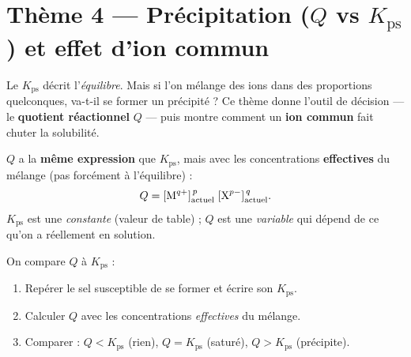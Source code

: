 \documentclass[11pt,a4paper]{article}
\begin{document}
\section*{\color{primarydark}Thème 4 — Précipitation ($Q$ vs $K_{\mathrm{ps}}$) et effet d'ion commun}

Le $K_{\mathrm{ps}}$ décrit l'\emph{équilibre}. Mais si l'on mélange des ions dans des proportions
quelconques, va-t-il se former un précipité ? Ce thème donne l'outil de décision — le \textbf{quotient
réactionnel} $Q$ — puis montre comment un \textbf{ion commun} fait chuter la solubilité.

\begin{cle}
$Q$ a la \textbf{même expression} que $K_{\mathrm{ps}}$, mais avec les concentrations
\textbf{effectives} du mélange (pas forcément à l'équilibre) :
\[ Q = [\ce{M^{q+}}]_{\text{actuel}}^{\,p}\;[\ce{X^{p-}}]_{\text{actuel}}^{\,q}. \]
$K_{\mathrm{ps}}$ est une \emph{constante} (valeur de table) ; $Q$ est une \emph{variable} qui dépend de
ce qu'on a réellement en solution.
\end{cle}

\begin{cle}
On compare $Q$ à $K_{\mathrm{ps}}$ :
\begin{center}
\end{center}
\end{cle}

\begin{methode}
\begin{enumerate}[leftmargin=1.7em,topsep=2pt,itemsep=1pt]
  \item Repérer le sel susceptible de se former et écrire son $K_{\mathrm{ps}}$.
  \item Calculer $Q$ avec les concentrations \emph{effectives} du mélange.
  \item Comparer : $Q<K_{\mathrm{ps}}$ (rien), $Q=K_{\mathrm{ps}}$ (saturé), $Q>K_{\mathrm{ps}}$
        (précipite).
\end{enumerate}
\end{methode}
\end{document}
